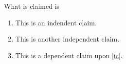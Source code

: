 

\noindent What is claimed is

  \begin{enumerate}

  \item[\clabel{ic}] This is an indendent claim.
  \item[\clabel{aic}] This is another independent claim.
  \item[\clabel{bcl}] This is a dependent claim upon \cref{ic}.

  \end{enumerate}


